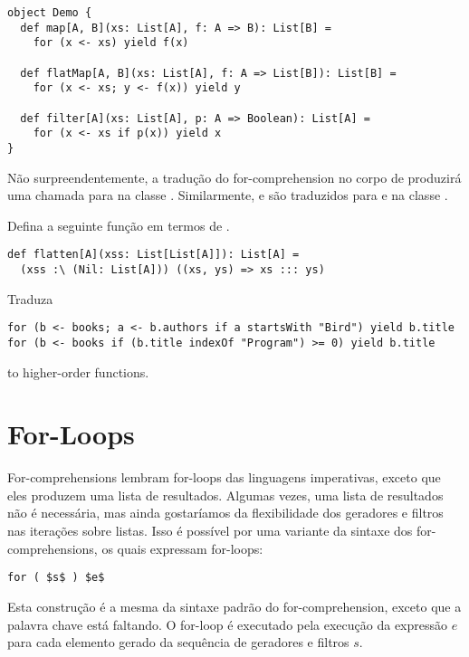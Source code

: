 \begin{lstlisting}
object Demo {
  def map[A, B](xs: List[A], f: A => B): List[B] =
    for (x <- xs) yield f(x)

  def flatMap[A, B](xs: List[A], f: A => List[B]): List[B] =
    for (x <- xs; y <- f(x)) yield y

  def filter[A](xs: List[A], p: A => Boolean): List[A] =
    for (x <- xs if p(x)) yield x
}
\end{lstlisting}
Não surpreendentemente, a tradução do for-comprehension no corpo de  produzirá
uma chamada para  na classe . Similarmente,  e
 são traduzidos para  e  na classe .

\begin{exercise}
Defina a seguinte função em termos de .
\begin{lstlisting}
def flatten[A](xss: List[List[A]]): List[A] =
  (xss :\ (Nil: List[A])) ((xs, ys) => xs ::: ys)
\end{lstlisting}
\end{exercise}

\begin{exercise}
Traduza 
\begin{lstlisting}
for (b <- books; a <- b.authors if a startsWith "Bird") yield b.title
for (b <- books if (b.title indexOf "Program") >= 0) yield b.title
\end{lstlisting}
to higher-order functions.
\end{exercise}

\section{For-Loops}\label{sec:for-loops}

For-comprehensions lembram for-loops das linguagens imperativas, exceto que eles produzem uma lista 
de resultados. Algumas vezes, uma lista de resultados não é necessária, mas ainda gostaríamos da
flexibilidade dos geradores e filtros nas iterações sobre listas. Isso é possível por uma variante
da sintaxe dos for-comprehensions, os quais expressam for-loops:  
\begin{lstlisting}
for ( $s$ ) $e$
\end{lstlisting}
Esta construção é a mesma da sintaxe padrão do for-comprehension, exceto que a palavra chave 
está faltando. O for-loop é executado pela execução da expressão $e$ para cada elemento gerado da sequência 
de geradores e filtros $s$.

